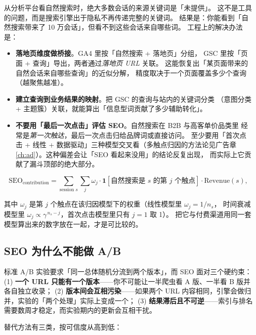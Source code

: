 从分析平台看自然搜索时，绝大多数会话的来源关键词是「未提供」。
这不是工具的问题，而是搜索引擎出于隐私不再传递完整的关键词。
结果是：你能看到「自然搜索带来了 10 万会话」，但看不到这些会话来自哪些词。
工程上的解决办法是：

\begin{itemize}
  \item \textbf{落地页维度做桥接}。GA4 里按「自然搜索 + 落地页」分组，
        GSC 里按「页面 + 查询」导出，两者通过\emph{落地页 URL} 关联。
        这能恢复出「某页面带来的自然会话来自哪些查询」的近似分解，
        精度取决于一个页面覆盖多少个查询（越聚焦越准）。
  \item \textbf{建立查询到业务结果的映射}。把 GSC 的查询与站内的关键词分类
        （意图分类 + 主题簇）关联，就能算出「信息型词贡献了多少辅助转化」。
  \item \textbf{不要用「最后一次点击」评估 SEO}。自然搜索在 B2B 与高客单价品类里
        经常是\emph{第一次触达}，最后一次点击归给品牌词或直接访问。
        至少要用「首次点击 + 线性 + 数据驱动」三种模型交叉看（多触点归因的方法论见广告章
        \cref{ch:ad}）。这种偏差会让「SEO 看起来没用」的结论反复出现，
        而实际上它贡献了漏斗顶部的绝大部分。
\end{itemize}

\begin{equation}
\text{SEO}_{\text{contribution}} = \sum_{\text{session } s} \sum_{j} \omega_j \cdot \mathbf{1}[\text{自然搜索是 } s \text{ 的第 } j \text{ 个触点}] \cdot \text{Revenue}(s) ,
\label{eq:seoattrib}
\end{equation}

其中 $\omega_j$ 是第 $j$ 个触点在该归因模型下的权重（线性模型里 $\omega_j = 1/n_s$，
时间衰减模型里 $\omega_j \propto \gamma^{\,n_s - j}$，首次点击模型里只有 $j=1$ 取 1）。
把它与付费渠道用同一套模型算出来的数字放在一起，才是可比较的。

\subsection{SEO 为什么不能做 A/B}

标准 A/B 实验要求「同一总体随机分流到两个版本」，而 SEO 面对三个硬约束：
(1) \textbf{一个 URL 只能有一个版本}——你不可能让一半爬虫看 A 版、一半看 B 版并各自独立收录；
(2) \textbf{版本间会互相污染}——如果两个 URL 内容相同，引擎会做归并，实验的「两个处理」实际上变成一个；
(3) \textbf{结果滞后且不可逆}——索引与排名需要数周才稳定，而实验期内的更新会互相干扰。

替代方法有三类，按可信度从高到低：

